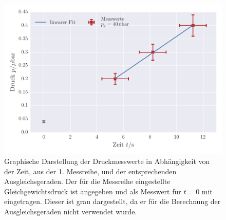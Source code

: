 \begin{figure}[!h]
 \centering \includegraphics[scale=0.8]{../Grafiken/Leckrate_Turbo_0.pdf}                                                          
 \caption{Graphische Darstellung der Druckmesswerte in Abhängigkeit von der Zeit, aus der 1. Messreihe, und der
 	entsprechenden Ausgleichsgeraden. Der für die Messreihe eingestellte Gleichgewichtsdruck ist angegeben und als Messwert für $t=0$ mit eingetragen. Dieser ist grau dargestellt, da er für die 
 	Berechnung der Ausgleichsgeraden nicht verwendet wurde.  \label{fig:leckrate_turbo_0}}
 \end{figure} 